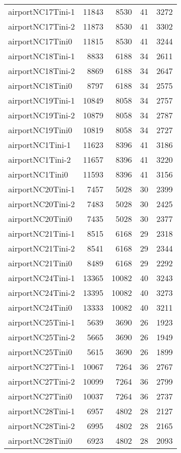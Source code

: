 \begin{tabular}{lrrrr}
airportNC17Tini-1 & 11843 & 8530 & 41 & 3272 \\
airportNC17Tini-2 & 11873 & 8530 & 41 & 3302 \\
airportNC17Tini0 & 11815 & 8530 & 41 & 3244 \\
airportNC18Tini-1 & 8833 & 6188 & 34 & 2611 \\
airportNC18Tini-2 & 8869 & 6188 & 34 & 2647 \\
airportNC18Tini0 & 8797 & 6188 & 34 & 2575 \\
airportNC19Tini-1 & 10849 & 8058 & 34 & 2757 \\
airportNC19Tini-2 & 10879 & 8058 & 34 & 2787 \\
airportNC19Tini0 & 10819 & 8058 & 34 & 2727 \\
airportNC1Tini-1 & 11623 & 8396 & 41 & 3186 \\
airportNC1Tini-2 & 11657 & 8396 & 41 & 3220 \\
airportNC1Tini0 & 11593 & 8396 & 41 & 3156 \\
airportNC20Tini-1 & 7457 & 5028 & 30 & 2399 \\
airportNC20Tini-2 & 7483 & 5028 & 30 & 2425 \\
airportNC20Tini0 & 7435 & 5028 & 30 & 2377 \\
airportNC21Tini-1 & 8515 & 6168 & 29 & 2318 \\
airportNC21Tini-2 & 8541 & 6168 & 29 & 2344 \\
airportNC21Tini0 & 8489 & 6168 & 29 & 2292 \\
airportNC24Tini-1 & 13365 & 10082 & 40 & 3243 \\
airportNC24Tini-2 & 13395 & 10082 & 40 & 3273 \\
airportNC24Tini0 & 13333 & 10082 & 40 & 3211 \\
airportNC25Tini-1 & 5639 & 3690 & 26 & 1923 \\
airportNC25Tini-2 & 5665 & 3690 & 26 & 1949 \\
airportNC25Tini0 & 5615 & 3690 & 26 & 1899 \\
airportNC27Tini-1 & 10067 & 7264 & 36 & 2767 \\
airportNC27Tini-2 & 10099 & 7264 & 36 & 2799 \\
airportNC27Tini0 & 10037 & 7264 & 36 & 2737 \\
airportNC28Tini-1 & 6957 & 4802 & 28 & 2127 \\
airportNC28Tini-2 & 6995 & 4802 & 28 & 2165 \\
airportNC28Tini0 & 6923 & 4802 & 28 & 2093 \\

\end{tabular}
